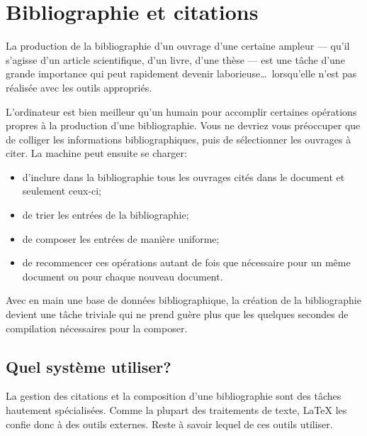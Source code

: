 
\chapter{Bibliographie et citations}
\label{chap:bibliographie}

\nobibliography*

La production de la bibliographie d'un ouvrage d'une certaine ampleur
--- qu'il s'agisse d'un article scientifique, d'un livre, d'une thèse
--- est une tâche d'une grande importance qui peut rapidement devenir
laborieuse\dots\ lorsqu'elle n'est pas réalisée avec les outils
appropriés.

L'ordinateur est bien meilleur qu'un humain pour accomplir certaines
opérations propres à la production d'une bibliographie. Vous ne
devriez vous préoccuper que de colliger les informations
bibliographiques, puis de sélectionner les ouvrages à citer. La
machine peut ensuite se charger:
\begin{itemize}
\item d'inclure dans la bibliographie tous les ouvrages cités dans le
  document et seulement ceux-ci;
\item de trier les entrées de la bibliographie;
\item de composer les entrées de manière uniforme;
\item de recommencer ces opérations autant de fois que nécessaire pour
  un même document ou pour chaque nouveau document.
\end{itemize}

Avec en main une base de données bibliographique, la création de la
bibliographie devient une tâche triviale qui ne prend guère plus que
les quelques secondes de compilation nécessaires pour la composer.



\section{Quel système utiliser?}
\label{sec:bibliographie:systeme}

La gestion des citations et la composition d'une bibliographie sont
des tâches hautement spécialisées. Comme la plupart des traitements de
texte, {\LaTeX} les confie donc à des outils externes. Reste à savoir
lequel de ces outils utiliser.

